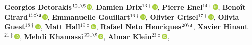 \textbf{Georgios Detorakis}$^{12\ddagger\S}$\href{http://orcid.org/0000-0001-5891-1702}{\includegraphics[width=8pt]{orcid}},
\textbf{Damien Drix}$^{13\ddagger}$\href{http://orcid.org/0000-0003-4107-5693}{\includegraphics[width=8pt]{orcid}},
\textbf{Pierre Enel}$^{14\ddagger}$\href{http://orcid.org/0000-0001-8983-6223}{\includegraphics[width=8pt]{orcid}},
\textbf{Benoît Girard}$^{15\ddagger\S}$\href{http://orcid.org/0000-0002-8117-7064}{\includegraphics[width=8pt]{orcid}},
\textbf{Emmanuelle Gouillart}$^{16\dagger}$\href{http://orcid.org/0000-0002-3869-9967}{\includegraphics[width=8pt]{orcid}},
\textbf{Olivier Grisel}$^{17\ddagger}$\href{http://orcid.org/0000-0002-8226-4012}{\includegraphics[width=8pt]{orcid}},
\textbf{Olivia Guest}$^{18\dagger}$\href{http://orcid.org/0000-0002-1891-0972}{\includegraphics[width=8pt]{orcid}},
\textbf{Matt Hall}$^{19\ddagger}$\href{http://orcid.org/0000-0002-9530-5477}{\includegraphics[width=8pt]{orcid}},
\textbf{Rafael Neto Henriques}$^{20\S}$,
\textbf{Xavier Hinaut}$^{21\ddagger}$\href{http://orcid.org/0000-0002-1924-1184}{\includegraphics[width=8pt]{orcid}},
\textbf{Mehdi Khamassi}$^{22\ddagger\S}$\href{http://orcid.org/0000-0002-2515-1046}{\includegraphics[width=8pt]{orcid}},
\textbf{Almar Klein}$^{23\ddagger}$\href{http://orcid.org/0000-0002-9978-2780}{\includegraphics[width=8pt]{orcid}},
